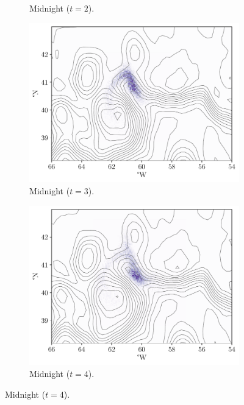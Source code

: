 \begin{figure}
\begin{subfigure}{0.49\textwidth}
		\caption{Midnight  (\(t = 2\)).}
		\label{fig:na_hist_t3_2}
	\end{subfigure}
	\begin{subfigure}{0.49\textwidth}
		\includegraphics[width=\textwidth]{chp06_applications/figures/gulf_stream/rels_ssh_3.0}
		\caption{Midnight  (\(t = 3\)).}
		\label{fig:na_hist_t3_3}
	\end{subfigure}
	\begin{subfigure}{0.49\textwidth}
		\includegraphics[width=\textwidth]{chp06_applications/figures/gulf_stream/rels_ssh_4.0}
		\caption{Midnight  (\(t = 4\)).}
		\label{fig:na_hist_t3_4}

\end{subfigure}
\end{figure}
